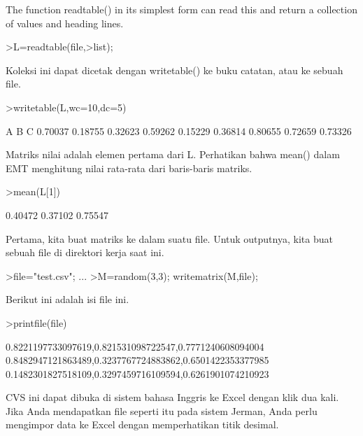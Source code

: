 \documentclass{article}
\begin{document}
\begin{eulernotebook}
\begin{euleroutput}
\end{euleroutput}
\begin{eulercomment}
The function readtable() in its simplest form can read this and return
a collection of values and heading lines.
\end{eulercomment}
\begin{eulerprompt}
>L=readtable(file,>list);
\end{eulerprompt}
\begin{eulercomment}
Koleksi ini dapat dicetak dengan writetable() ke buku catatan, atau ke
sebuah file.
\end{eulercomment}
\begin{eulerprompt}
>writetable(L,wc=10,dc=5)
\end{eulerprompt}
\begin{euleroutput}
           A         B         C
     0.70037   0.18755   0.32623
     0.59262   0.15229   0.36814
     0.80655   0.72659   0.73326
\end{euleroutput}
\begin{eulercomment}
Matriks nilai adalah elemen pertama dari L. Perhatikan bahwa mean()
dalam EMT menghitung nilai rata-rata dari baris-baris matriks.
\end{eulercomment}
\begin{eulerprompt}
>mean(L[1])
\end{eulerprompt}
\begin{euleroutput}
    0.40472 
    0.37102 
    0.75547 
\end{euleroutput}
\begin{eulercomment}
Pertama, kita buat matriks ke dalam suatu file. Untuk outputnya, kita
buat sebuah file di direktori kerja saat ini.
\end{eulercomment}
\begin{eulerprompt}
>file="test.csv";  ...
>M=random(3,3); writematrix(M,file);
\end{eulerprompt}
\begin{eulercomment}
Berikut ini adalah isi file ini.
\end{eulercomment}
\begin{eulerprompt}
>printfile(file)
\end{eulerprompt}
\begin{euleroutput}
  0.8221197733097619,0.821531098722547,0.7771240608094004
  0.8482947121863489,0.3237767724883862,0.6501422353377985
  0.1482301827518109,0.3297459716109594,0.6261901074210923
  
\end{euleroutput}
\begin{eulercomment}
CVS ini dapat dibuka di sistem bahasa Inggris ke Excel dengan klik dua
kali. Jika Anda mendapatkan file seperti itu pada sistem Jerman, Anda
perlu mengimpor data ke Excel dengan memperhatikan titik desimal.


\end{eulercomment}
\end{eulernotebook}
\end{document}
